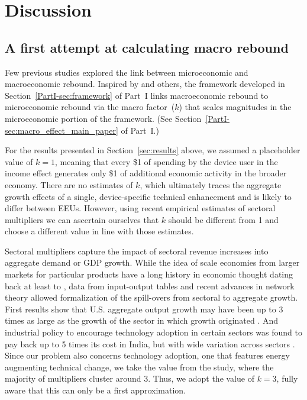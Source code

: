 \documentclass[12pt]{article}\usepackage[]{graphicx}\usepackage[]{xcolor}
\begin{document}
\section{Discussion}
\label{sec:discussion}


\subsection{A first attempt at calculating macro rebound}
\label{sec:calculating_k}



Few previous studies explored the link
between microeconomic and macroeconomic rebound.
Inspired by \citet{Borenstein:2015aa} and others,
the framework developed in Section~\ref{PartI-sec:framework} of Part~I
links macroeconomic rebound to microeconomic rebound
via the macro factor~($k$) that scales
magnitudes in the microeconomic portion of the framework.
(See Section~\ref{PartI-sec:macro_effect_main_paper} of Part~I.)

For the results presented in Section~\ref{sec:results} above,
we assumed a placeholder value of $k = 1$,
meaning that every \$1 of spending by the device user in the income effect
generates only \$1 of additional economic activity in the broader economy.
There are no estimates of $k$, which ultimately traces the aggregate growth
effects of a single, device-specific technical enhancement and is likely
to differ between EEUs. However, using recent empirical estimates of
sectoral multipliers we can ascertain ourselves that $k$ should be different
from 1 and choose a different value in line with those estimates.

Sectoral multipliers capture the impact of sectoral revenue increases
into aggregate demand or GDP growth.
While the idea of scale economies
from larger markets for particular products have a long
history in economic thought dating back at least to \citet{Smith1776},
data from input-output tables and recent advances in network theory
allowed formalization of the spill-overs from sectoral to aggregate growth.
First results show that U.S. aggregate output growth
may have been up to 3 times as large as the growth of the sector in which
growth originated \citep{Foerster2022}.
And industrial policy to
encourage technology adoption in certain sectors was found to pay back
up to 5 times its cost in India, but with wide variation
across sectors \citep{Buera2024}.
Since our problem also concerns technology adoption,
one that features energy augmenting technical change,
we take the value from the \citet{Buera2024} study,
where the majority of multipliers cluster around 3.
Thus, we adopt the value of $k = 3$,
fully aware that this can only be a first approximation.
\end{document}
